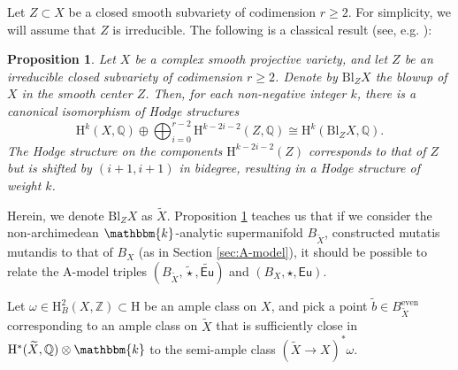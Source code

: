 \documentclass[12pt,a4paper]{amsart}
\newtheorem{proposition}[theorem]{Proposition}
\theoremstyle{definition}
\theoremstyle{remark}
\begin{document}
Let \( Z \subset X \) be a closed smooth subvariety of codimension \( r \geq 2 \). For simplicity, we will assume that \( Z \) is irreducible. The following is a classical result (see, e.g. \cite[Theorem 7.31]{Voisin_2002}):

\begin{proposition}\label{thm:voisin}
    Let \( X \) be a complex smooth projective variety, and let \( Z \) be an irreducible closed subvariety of codimension \( r \geq 2 \). Denote by \( \mathrm{Bl}_Z X \) the blowup of \( X \) in the smooth center \( Z \). Then, for each non-negative integer \( k \), there is a canonical isomorphism of Hodge structures
    \[
    \mathrm{H}^k (X, \mathbb{Q}) \oplus \bigoplus_{i=0}^{r-2} \mathrm{H}^{k-2i-2}(Z, \mathbb{Q}) \cong \mathrm{H}^k (\mathrm{Bl}_Z X, \mathbb{Q}).
    \]
    The Hodge structure on the components \( \mathrm{H}^{k-2i-2}(Z) \) corresponds to that of \( Z \) but is shifted by \( (i+1, i+1) \) in bidegree, resulting in a Hodge structure of weight \( k \).
\end{proposition}

Herein, we denote \(\mathrm{Bl}_Z X\) as \(\widetilde{X}\). Proposition \ref{thm:voisin} teaches us that if we consider the non-archimedean $\mathbbm{k}$-analytic supermanifold \(B_{\widetilde{X}}\), constructed mutatis mutandis to that of \(B_X\) (as in Section \ref{sec:A-model}), it should be possible to relate the A-model triples \((B_{\widetilde{X}}, \widetilde{\star}, \widetilde{\mathsf{Eu}})\) and \((B_X, \star, \mathsf{Eu})\).

Let \(\omega \in \mathrm{H}^2_B(X, \mathbb{Z}) \subset \mathrm{H}\) be an ample class on \(X\), and pick a point \(\widetilde{b} \in B_{\widetilde X}^{\text{even}}\) corresponding to an ample class on \(\widetilde{X}\) that is sufficiently close in \(\mathrm{H}^{\ast}(\widetilde{X}, \mathbb{Q}) \otimes \mathbbm{k}\) to the semi-ample class \((\widetilde{X} \rightarrow X)^{\ast} \omega\). 
\end{document}
